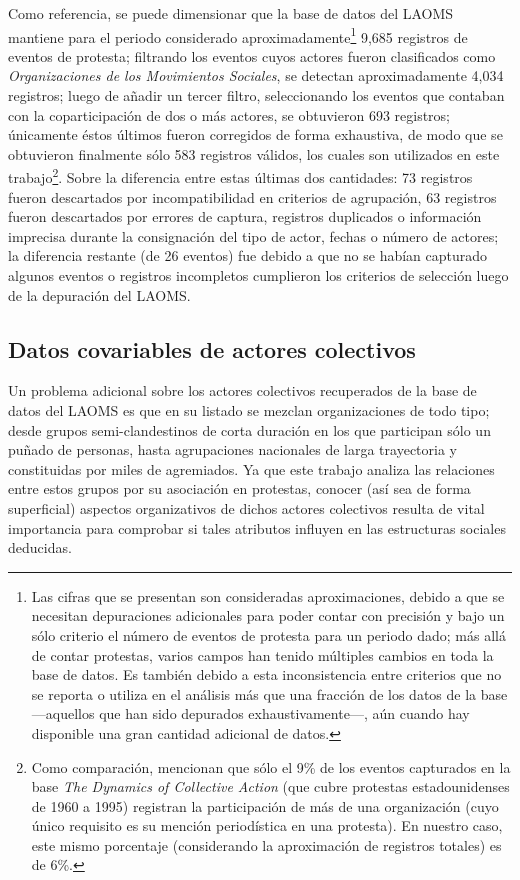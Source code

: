 \documentclass[letterpaper, 11pt]{book}
\theoremstyle{definition}
\theoremstyle{remark}
\begin{document}
Como referencia, se puede dimensionar que la base de datos del LAOMS mantiene para el periodo considerado aproximadamente\footnote{
    Las cifras que se presentan son consideradas aproximaciones, debido a que se necesitan depuraciones adicionales para poder contar con precisión  y bajo un sólo criterio el número de eventos de protesta para un periodo dado; más allá de contar protestas, varios campos han tenido múltiples cambios en toda la base de datos. 
    Es también debido a esta inconsistencia entre criterios que no se reporta o utiliza en el análisis más que una fracción de los datos de la base ---aquellos que han sido depurados exhaustivamente---, aún cuando hay disponible una gran cantidad adicional de datos.
} 
9,685 registros de eventos de protesta; filtrando los eventos cuyos actores fueron clasificados como \emph{Organizaciones de los Movimientos Sociales}, se detectan aproximadamente 4,034 registros; luego de añadir un tercer filtro, seleccionando los eventos que contaban con la coparticipación de dos o más actores, se obtuvieron 693 registros; únicamente éstos últimos fueron corregidos de forma exhaustiva, de modo que se obtuvieron finalmente sólo 583 registros válidos, los cuales son utilizados en este trabajo\footnote{
    Como comparación, \citet{2012_Wand_andSoule_ColabiracionOMS} mencionan que sólo el 9\% de los eventos capturados en la base \emph{The Dynamics of Collective Action} (que cubre protestas estadounidenses de 1960 a 1995) registran la participación de más de una organización (cuyo único requisito es su mención periodística en una protesta). 
    En nuestro caso, este mismo porcentaje (considerando la aproximación de registros totales) es de 6\%.
}. 
Sobre la diferencia entre estas últimas dos cantidades: 73 registros fueron descartados por incompatibilidad en criterios de agrupación, 63 registros fueron descartados por errores de captura, registros duplicados o información imprecisa durante la consignación del tipo de actor, fechas o número de actores; la diferencia restante (de 26 eventos) fue debido a que no se habían capturado algunos eventos o registros incompletos cumplieron los criterios de selección luego de la depuración del LAOMS.




\subsection{Datos covariables de actores colectivos}
\label{sec:DatosOMS}

Un problema adicional sobre los actores colectivos recuperados de la base de datos del LAOMS es que en su listado se mezclan organizaciones de todo tipo; desde grupos semi-clandestinos de corta duración en los que participan sólo un puñado de personas, hasta agrupaciones nacionales de larga trayectoria y constituidas por miles de agremiados. 
Ya que este trabajo analiza las relaciones entre estos grupos por su asociación en protestas, conocer (así sea de forma superficial) aspectos organizativos de dichos actores colectivos resulta de vital importancia para comprobar si tales atributos influyen en las estructuras sociales deducidas.
\end{document}
